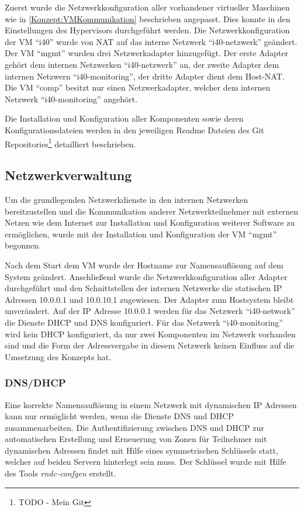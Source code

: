 Zuerst wurde die Netzwerkkonfiguration aller vorhandener virtueller Maschinen wie in \autoref{Konzept:VMKommunikation} beschrieben angepasst. Dies konnte in den Einstellungen des Hypervisors durchgeführt werden. Die Netzwerkkonfiguration der \ac{VM} "`i40"' wurde von \ac{NAT} auf das interne Netzwerk "`i40-netzwerk"' geändert. Der \ac{VM} "`mgmt"' wurden drei Netzwerkadapter hinzugefügt. Der erste Adapter gehört dem internen Netzwerken "`i40-netzwerk"' an, der zweite Adapter dem internen Netzwern "`i40-monitoring"', der dritte Adapter dient dem Host-\ac{NAT}. Die \ac{VM} "`comp"' besitzt nur einen Netzwerkadapter, welcher dem internen Netzwerk "`i40-monitoring"' angehört.

Die Installation und Konfiguration aller Komponenten sowie deren Konfigurationsdateien werden in den jeweiligen Readme Dateien des Git Repositories\footnote{TODO - Mein Git} detailliert beschrieben.

\subsection{Netzwerkverwaltung}
Um die grundlegenden Netzwerkdienste in den internen Netzwerken bereitzustellen und die Kommunikation anderer Netzwerkteilnehmer mit externen Netzen wie dem Internet zur Installation und Konfiguration weiterer Software zu ermöglichen, wurde mit der Installation und Konfiguration der \ac{VM} "`mgmt"' begonnen.

Nach dem Start dem \ac{VM} wurde der Hostname zur Namensauflösung auf dem System geändert. Anschließend wurde die Netzwerkkonfiguration aller Adapter durchgeführt und den Schnittstellen der internen Netzwerke die statischen \ac{IP} Adressen 10.0.0.1 und 10.0.10.1 zugewiesen. Der Adapter zum Hostsystem bleibt unverändert. Auf der \ac{IP} Adresse 10.0.0.1 werden für das Netzwerk "`i40-network"' die Dienste \ac{DHCP} und \ac{DNS} konfiguriert. Für das Netzwerk "`i40-monitoring"' wird kein \ac{DHCP} konfiguriert, da nur zwei Komponenten im Netzwerk vorhanden sind und die Form der Adressvergabe in diesem Netzwerk keinen Einfluss auf die Umsetzung des Konzepts hat. 

\subsubsection{\ac{DNS}/\ac{DHCP}}
Eine korrekte Namensauflösung in einem Netzwerk mit dynamischen \ac{IP} Adressen kann nur ermöglicht werden, wenn die Dienste \ac{DNS} und \ac{DHCP} zusammenarbeiten. Die Authentifizierung zwischen \ac{DNS} und \ac{DHCP} zur automatischen Erstellung und Erneuerung von Zonen für Teilnehmer mit dynamischen Adressen findet mit Hilfe eines symmetrischen Schlüssels statt, welcher auf beiden Servern hinterlegt sein muss. Der Schlüssel wurde mit Hilfe des Tools \textit{rndc-confgen} erstellt.

